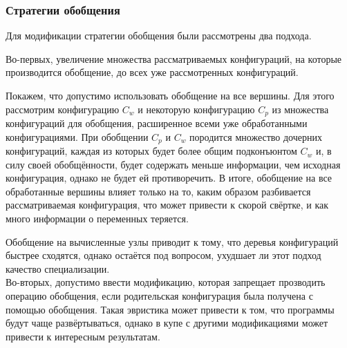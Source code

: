 
\subsubsection{Стратегии обобщения}

Для модификации стратегии обобщения были рассмотрены два подхода.


Во-первых, увеличение множества рассматриваемых конфигураций, на которые
производится обобщение, до всех уже рассмотренных конфигураций.

Покажем, что допустимо использовать обобщение на все вершины.
Для этого рассмотрим конфигурацию $C_w$ и некоторую конфигурацию $C_p$ из множества
конфигураций для обобщения, расширенное всеми уже обработанными конфигурациями.
При обобщении $C_p$ и $C_w$ породится множество дочерних конфигураций, %
каждая из которых будет более общим подконъюнтом $C_w$ и, в силу своей
обобщённости, будет содержать меньше информации, чем исходная конфигурация,
однако не будет ей противоречить. В итоге, обобщение на все обработанные
вершины влияет только на то, каким образом разбивается рассматриваемая
конфигурация, что может привести к скорой свёртке, и как много информации о
переменных теряется. 


Обобщение на вычисленные узлы приводит к тому, что деревья конфигураций
быстрее сходятся, однако остаётся под вопросом, ухудшает ли этот подход
качество специализации. \\

Во-вторых, допустимо ввести модификацию, которая запрещает прозводить операцию
обобщения, если родительская конфигурация была получена с помощью обобщения.
Такая эвристика может привести к том, что программы будут чаще развёртываться,
однако в купе с другими модификациями может привести к интересным результатам. \\

